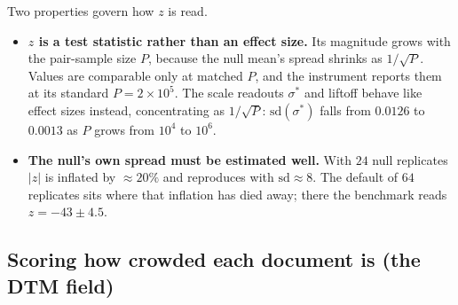 \documentclass[11pt,letterpaper]{article}
\newcommand{\sstar}{\sigma^{*}}
\begin{document}
Two properties govern how $z$ is read.
\begin{itemize}
\item \textbf{$z$ is a test statistic rather than an effect size.} Its magnitude
  grows with the pair-sample size $P$, because the null mean's spread
  shrinks as $1/\sqrt P$. Values are comparable only at matched $P$, and
  the instrument reports them at its standard $P = 2{\times}10^5$. The
  scale readouts $\sstar$ and liftoff behave like effect sizes instead,
  concentrating as $1/\sqrt P$: $\mathrm{sd}(\sstar)$ falls from $0.0126$
  to $0.0013$ as $P$ grows from $10^4$ to $10^6$.
\item \textbf{The null's own spread must be estimated well.} With $24$
  null replicates $|z|$ is inflated by $\approx 20\%$ and reproduces with
  $\mathrm{sd} \approx 8$. The default of $64$ replicates sits where that
  inflation has died away; there the benchmark reads $z = -43 \pm 4.5$.
\end{itemize}

\subsection{Scoring how crowded each document is (the DTM field)}
\label{sec:dtm}
\end{document}
